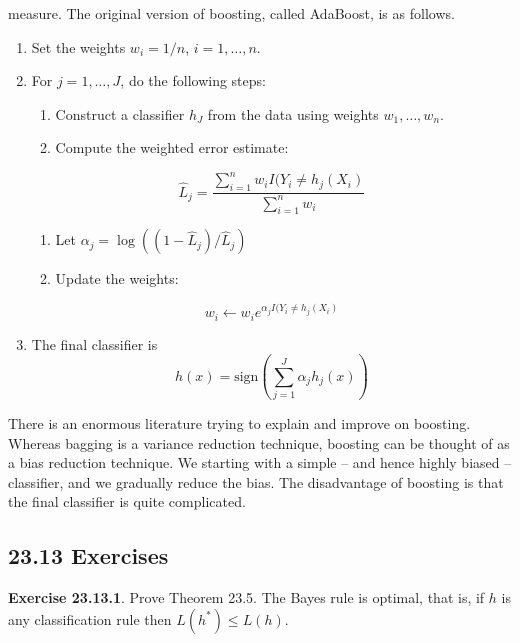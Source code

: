 measure. The original version of boosting, called AdaBoost, is as
follows.
\begin{enumerate}
\def\labelenumi{\arabic{enumi}.}
\item
  Set the weights \(w_{i} = 1 / n\), \(i = 1, \dots, n\).
\item
  For \(j = 1, \dots, J\), do the following steps:
  \begin{enumerate}
  \def\labelenumii{(\alph{enumii})}
  \item
    Construct a classifier \(h_J\) from the data using weights
\(w_{1}, \dots, w_{n}\).
  \item
    Compute the weighted error estimate:
  \end{enumerate}
  \[
\hat{L}_{j} = \frac{\sum_{i=1}^{n} w_{i} I(Y_{i} \neq h_{j}(X_{i}) }{\sum_{i=1}^{n} w_{i}}
\]
  \begin{enumerate}
  \def\labelenumii{(\alph{enumii})}
  \setcounter{enumii}{2}
  \item
    Let \(\alpha_{j} = \log (( 1 - \hat{L}_{j}) / \hat{L}_{j})\)
  \item
    Update the weights:
  \end{enumerate}
  \[
w_{i} \leftarrow w_{i} e^{\alpha_{j} I(Y_{i} \neq h_{j}(X_{i})}
\]
\item
  The final classifier is
  \[
\hat{h}(x) = \text{sign} \left( \sum_{j=1}^J \alpha_{j} h_{j}(x) \right)
\]
\end{enumerate}
There is an enormous literature trying to explain and improve on
boosting. Whereas bagging is a variance reduction technique, boosting
can be thought of as a bias reduction technique. We starting with a
simple -- and hence highly biased -- classifier, and we gradually reduce
the bias. The disadvantage of boosting is that the final classifier is
quite complicated.

\subsection*{23.13 Exercises}

\textbf{Exercise 23.13.1}. Prove Theorem 23.5.
The Bayes rule is optimal, that is, if \(h\) is any classification rule
then \(L(h^{*}) \leq L(h)\).

